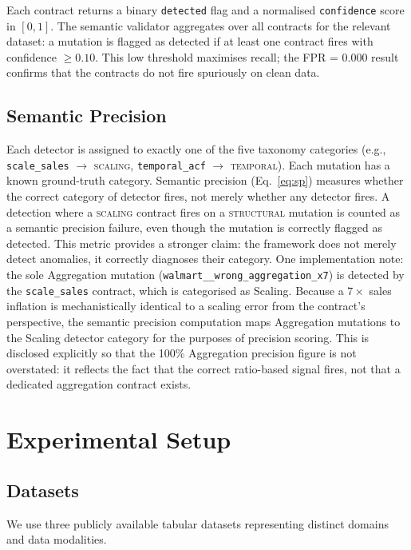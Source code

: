 \documentclass[journal]{IEEEtran}
\newcommand{\mut}[1]{\mbox{\texttt{#1}}}
\begin{document}
Each contract returns a binary \texttt{detected} flag and a normalised
\texttt{confidence} score in $[0,1]$.  The semantic validator aggregates
over all contracts for the relevant dataset: a mutation is flagged as
detected if at least one contract fires with confidence $\geq 0.10$.
This low threshold maximises recall; the FPR = 0.000 result confirms that
the contracts do not fire spuriously on clean data.

\subsection{Semantic Precision}

Each detector is assigned to exactly one of the five taxonomy categories
(e.g., \texttt{scale\_sales} $\rightarrow$ \textsc{scaling},
\texttt{temporal\_acf} $\rightarrow$ \textsc{temporal}).  Each mutation has
a known ground-truth category.  Semantic precision (Eq.~\ref{eq:sp})
measures whether the correct category of detector fires, not merely whether
any detector fires.  A detection where a \textsc{scaling} contract fires on
a \textsc{structural} mutation is counted as a semantic precision failure,
even though the mutation is correctly flagged as detected.  This metric
provides a stronger claim: the framework does not merely detect anomalies,
it correctly diagnoses their category.
One implementation note: the sole Aggregation mutation
(\mut{walmart\_\_wrong\_aggregation\_x7}) is detected by the
\texttt{scale\_sales} contract, which is categorised as Scaling.  Because
a $7\times$ sales inflation is mechanistically identical to a scaling error
from the contract's perspective, the semantic precision computation maps
Aggregation mutations to the Scaling detector category for the purposes of
precision scoring.  This is disclosed explicitly so that the 100\%
Aggregation precision figure is not overstated: it reflects the fact that
the correct ratio-based signal fires, not that a dedicated aggregation
contract exists.


\section{Experimental Setup}
\label{sec:setup}


\subsection{Datasets}

We use three publicly available tabular datasets representing distinct
domains and data modalities.
\end{document}

